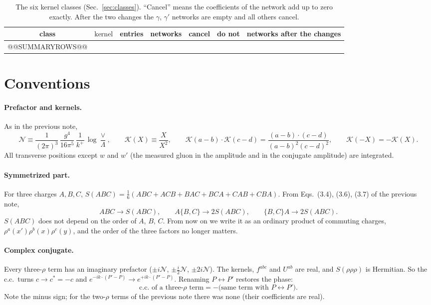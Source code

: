 \documentclass[10pt]{article}
\numberwithin{equation}{section}
\newcommand{\KK}{\mathcal K}
\newcommand{\NN}{\mathcal N}
\begin{document}
\begin{table}[h]
\centering\small
\begin{tabular}{@{}c >{$}l<{$} c c c c c@{}}
class & \text{kernel} & entries & networks & cancel & do not & networks after the changes\\ \hline
@@SUMMARYROWS@@
\end{tabular}
\caption{The six kernel classes (Sec.~\ref{sec:classes}). ``Cancel'' means the coefficients of the network add up to zero exactly. After the two changes the $\gamma$, $\gamma'$ networks are empty and all others cancel.}
\label{tab:summary}
\end{table}

\section{Conventions}\label{sec:conv}

\paragraph{Prefactor and kernels.} As in the previous note,
\begin{equation}
\NN\equiv\frac{1}{(2\pi)^3}\,\frac{g^4}{16\pi^5}\,\frac{1}{k^+}\,\log\frac{\vee}{\Lambda},\qquad
\KK(X)\equiv\frac{X}{X^2},\qquad \KK(a-b)\cdot\KK(c-d)=\frac{(a-b)\cdot(c-d)}{(a-b)^2(c-d)^2},\qquad \KK(-X)=-\KK(X).
\end{equation}
All transverse positions except $w$ and $w'$ (the measured gluon in the amplitude and in the conjugate amplitude) are integrated.

\paragraph{Symmetrized part.} For three charges $A,B,C$, $S(ABC)=\frac16(ABC+ACB+BAC+BCA+CAB+CBA)$. From Eqs.~(3.4), (3.6), (3.7) of the previous note,
\begin{equation}
ABC\to S(ABC),\qquad A\{B,C\}\to 2S(ABC),\qquad \{B,C\}A\to 2S(ABC).
\end{equation}
$S(ABC)$ does not depend on the order of $A$, $B$, $C$. From now on we write it as an ordinary product of commuting charges, $\rho^a(x')\rho^b(x)\rho^c(y)$, and the order of the three factors no longer matters.

\paragraph{Complex conjugate.} Every three-$\rho$ term has an imaginary prefactor ($\pm i\NN$, $\pm\frac i2\NN$, $\pm2i\NN$). The kernels, $f^{abc}$ and $U^{ab}$ are real, and $S(\rho\rho\rho)$ is Hermitian. So the c.c.\ turns $c\to c^*=-c$ and $e^{-ik\cdot(P'-P)}\to e^{+ik\cdot(P'-P)}$. Renaming $P\leftrightarrow P'$ restores the phase:
\begin{equation}
\text{c.c.\ of a three-$\rho$ term}=-\big(\text{same term with }P\leftrightarrow P'\big).
\label{eq:cc}
\end{equation}
Note the minus sign; for the two-$\rho$ terms of the previous note there was none (their coefficients are real).
\end{document}
